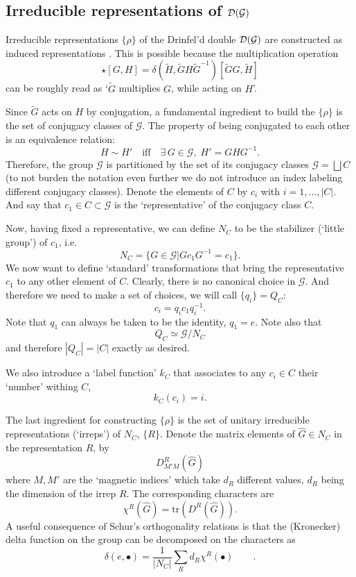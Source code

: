 \documentclass[nofootinbib,superscriptaddress,eqsecnum,tightenlines,11pt]{revtex4-1}
\def\tr{\text{tr}}
\def\q{\qquad}
\def\mG{\mathcal{G}}
\def\be{\begin{equation}}
\def\ee{\end{equation}}
\renewcommand{\tilde}{\widetilde}
\begin{document}
\subsection{Irreducible representations of ${\cal D}(\mG)$ \label{sec_irreps}}

Irreducible representations $\{\rho\}$ of the Drinfel'd double ${\cal D}(\mG)$ are constructed as induced representations \cite{Verlinde,BaisReview}.
This is possible because the multiplication operation
\be
[\tilde G, \tilde H] \star [G,H] = \delta(  \tilde H, \tilde G H \tilde G^{-1}) [\tilde G G, \tilde H]
\ee
can be roughly read as `$\tilde G$ multiplies $G$, while acting on $H$'.

Since $\tilde G$ acts on $H$ by conjugation, a fundamental ingredient to build the $\{\rho\}$ is the set of conjugacy classes of $\mG$.
The property of being conjugated to each other is an equivalence relation:
\be
H\sim H'\quad\text{iff}\quad \exists \, G\in\mG ,\; H' = G H G^{-1}.
\ee
Therefore, the group $\mG$ is partitioned by the set of its conjugacy classes $\mG = \bigsqcup C$ (to not burden the notation even further we do not introduce an index labeling different conjugacy classes).
Denote the elements of $C$ by $c_i$ with $i=1,\dots,|C|$. 
And say that $c_1 \in C\subset\mG$ is the `representative' of the conjugacy class $C$.

Now, having fixed a representative, we can define $N_C$ to be the stabilizer (`little group') of $c_1$, i.e.
\be
N_C = \{ G\in \mG | G c_1 G^{-1} = c_1 \}.
\ee
We now want to define `standard' transformations that bring the representative $c_1$ to any other element of $C$.
Clearly, there is no canonical choice in $\mG$.
And therefore we need to make a set of choices, we will call $\{q_i\} = Q_C$:
\be
c_i = q_i c_1 q_i^{-1}.
\ee
Note that $q_1$ can always be taken to be the identity, $q_1 = e$.
Note also that
\be
Q_C \simeq \mG/N_C
\ee
and therefore $|Q_C| = |C|$ exactly as desired.

We also introduce a `label function' $k_C$ that associates to any $c_i\in C$ their `number' withing $C$,
\be
k_C(c_i) = i.
\ee

The last ingredient for constructing $\{\rho\}$ is the set of unitary irreducible representations (`irreps') of $N_C$, $\{ R\}$.
Denote the matrix elements of $\widehat G\in N_C$ in the representation $R$, by
\be
D^R_{M' M} (\widehat G)
\ee
where $M, M'$ are the `magnetic indices' which take $d_R$ different values, $d_R$ being the dimension of the irrep $R$.
The corresponding characters are
\be
\chi^R(\widehat G) = \tr( D^R(\widehat G) ).
\ee
A useful consequence of Schur's orthogonality relations is that the (Kronecker) delta function on the group can be decomposed on the characters as
\be
\delta(e, {\scriptstyle \bullet}) = \frac{1}{|N_C|} \sum_{R} d_R \chi^R({\scriptstyle \bullet}) \q \label{delta_stabilizer} .
\ee
\end{document}
